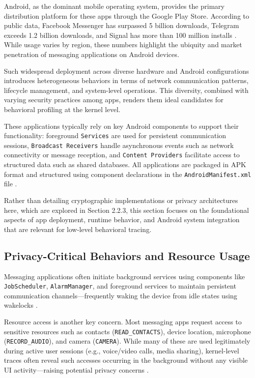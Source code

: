 \documentclass[a4paper,12pt]{report}
\begin{document}
Android, as the dominant mobile operating system, provides the primary distribution platform for these apps through the Google Play Store. According to public data, Facebook Messenger has surpassed 5 billion downloads, Telegram exceeds 1.2 billion downloads, and Signal has more than 100 million installs \cite{StatistaMessenger, StatistaTelegram, StatistaSignal}. While usage varies by region, these numbers highlight the ubiquity and market penetration of messaging applications on Android devices.

Such widespread deployment across diverse hardware and Android configurations introduces heterogeneous behaviors in terms of network communication patterns, lifecycle management, and system-level operations. This diversity, combined with varying security practices among apps, renders them ideal candidates for behavioral profiling at the kernel level.

These applications typically rely on key Android components to support their functionality: foreground \texttt{Services} are used for persistent communication sessions, \texttt{Broadcast Receivers} handle asynchronous events such as network connectivity or message reception, and \texttt{Content Providers} facilitate access to structured data such as shared databases. All applications are packaged in APK format and structured using component declarations in the \texttt{AndroidManifest.xml} file \cite{AOSPArchOverview}.

Rather than detailing cryptographic implementations or privacy architectures here, which are explored in Section 2.2.3, this section focuses on the foundational aspects of app deployment, runtime behavior, and Android system integration that are relevant for low-level behavioral tracing.

\subsection{Privacy-Critical Behaviors and Resource Usage}
Messaging applications often initiate background services using components like \texttt{JobScheduler}, \texttt{AlarmManager}, and foreground services to maintain persistent communication channels—frequently waking the device from idle states using wakelocks \cite{AOSPWakelocks}.

Resource access is another key concern. Most messaging apps request access to sensitive resources such as contacts (\texttt{READ\_CONTACTS}), device location, microphone (\texttt{RECORD\_AUDIO}), and camera (\texttt{CAMERA}). While many of these are used legitimately during active user sessions (e.g., voice/video calls, media sharing), kernel-level traces often reveal such accesses occurring in the background without any visible UI activity—raising potential privacy concerns \cite{enck2014taintdroid}.
\end{document}
